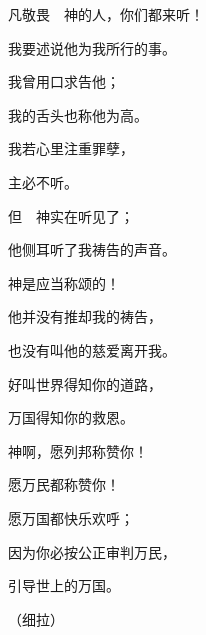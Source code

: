 {\BB \par }{\Q {}凡敬畏　神的人，你们都来听！
\par }{\Q 我要述说他为我所行的事。
\par }{\Q {}我曾用口求告他；
\par }{\Q 我的舌头也称他为高。
\par }{\Q {}我若心里注重罪孽，
\par }{\Q 主必不听。
\par }{\Q {}但　神实在听见了；
\par }{\Q 他侧耳听了我祷告的声音。
\par }{\BB \par }{\Q {}神是应当称颂的！
\par }{\Q 他并没有推却我的祷告，
\par }{\Q 也没有叫他的慈爱离开我。

\par }
{\Q {}好叫世界得知你的道路，
\par }{\Q 万国得知你的救恩。
\par }{\Q {}神啊，愿列邦称赞你！
\par }{\Q 愿万民都称赞你！
\par }{\BB \par }{\Q {}愿万国都快乐欢呼；
\par }{\Q 因为你必按公正审判万民，
\par }{\Q 引导世上的万国。
\par }{\QS （细拉）
\par }
